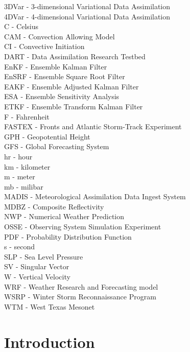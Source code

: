 \documentclass{ttuthes2007}
\begin{document}
3DVar - 3-dimensional Variational Data Assimilation \\
4DVar - 4-dimensional Variational Data Assimilation \\
C - Celsius \\
CAM - Convection Allowing Model \\
CI - Convective Initiation \\
DART - Data Assimilation Research Testbed \\
EnKF - Ensemble Kalman Filter \\
EnSRF - Ensemble Square Root Filter \\
EAKF - Ensemble Adjusted Kalman Filter \\
ESA - Ensemble Sensitivity Analysis \\
ETKF - Ensemble Transform Kalman Filter \\
F - Fahrenheit \\
FASTEX - Fronts and Atlantic Storm-Track Experiment \\
GPH - Geopotential Height \\
GFS - Global Forecasting System \\
hr - hour \\
km - kilometer \\
m - meter \\
mb - milibar \\
MADIS - Meteorological Assimilation Data Ingest System \\
MDBZ - Composite Reflectivity \\
NWP - Numerical Weather Prediction \\
OSSE - Observing System Simulation Experiment \\
PDF - Probability Distribution Function \\
s - second \\
SLP - Sea Level Pressure \\
SV - Singular Vector \\
W - Vertical Velocity \\
WRF - Weather Research and Forecasting model \\
WSRP - Winter Storm Reconnaissance Program \\
WTM - West Texas Mesonet \\




\mainmatter
\chapter{Introduction}
\end{document}
